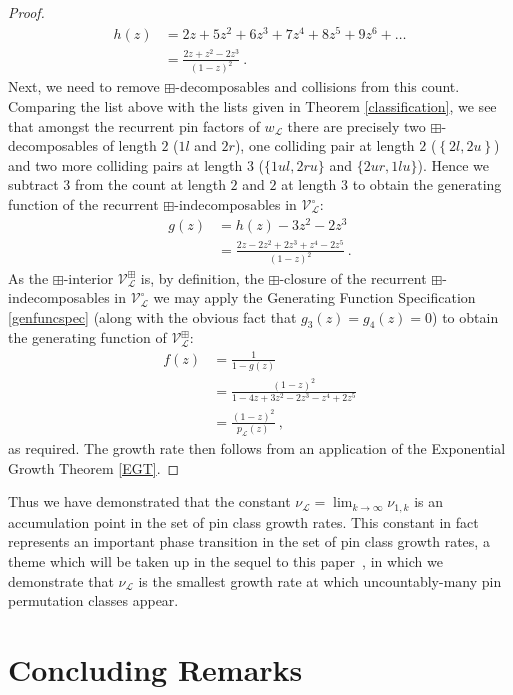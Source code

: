 \documentclass[11pt,a4paper]{article}
\theoremstyle{definition}
\begin{document}
\begin{proof}
\[
\begin{split}
h(z) & = 2z + 5z^2 + 6z^3 + 7z^4 + 8z^5 + 9z^6 + \dots \\
 & = \frac{2z + z^2 - 2z^3}{(1-z)^2} \ .
\end{split}
\]
Next, we need to remove $\boxplus$-decomposables and collisions from this count. Comparing the list above with the lists given in Theorem \ref{classification}, we see that amongst the recurrent pin factors of $w_{\mathcal{L}}$ there are precisely two $\boxplus$-decomposables of length $2$ ($1l$ and $2r$), one colliding pair at length $2$ ($\left\{2l,2u\right\}$) and two more colliding pairs at length $3$ ($\{1ul,2ru\}$ and $\{2ur,1lu\}$). Hence we subtract $3$ from the count at length $2$ and $2$ at length $3$ to obtain the generating function of the recurrent $\boxplus$-indecomposables in $\mathcal{V}^{\circ}_{\mathcal{L}}$:
\[
\begin{split}
g(z) & = h(z) - 3z^2 - 2z^3 \\
 & = \frac{2z - 2z^2 + 2z^3 + z^4 - 2z^5}{(1-z)^2} \ .
\end{split}
\]
As the $\boxplus$-interior $\mathcal{V}^{\boxplus}_{\mathcal{L}}$ is, by definition, the $\boxplus$-closure of the recurrent $\boxplus$-indecomposables in $\mathcal{V}^{\circ}_{\mathcal{L}}$ we may apply the Generating Function Specification \ref{genfuncspec} (along with the obvious fact that $g_{3}(z) = g_{4}(z) = 0$) to obtain the generating function of $\mathcal{V}^{\boxplus}_{\mathcal{L}}$:
\[
\begin{split}
f(z) & = \frac{1}{1-g(z)} \\
 & = \frac{(1-z)^2}{1 - 4z + 3z^2 - 2z^3 - z^4 + 2z^5} \\
 & = \frac{(1-z)^2}{p_{\mathcal{L}}(z)} \ ,
\end{split}
\]
as required. The growth rate then follows from an application of the Exponential Growth Theorem \ref{EGT}. \qedhere
\end{proof}

Thus we have demonstrated that the constant $\nu_{\mathcal{L}} = \lim_{k \rightarrow \infty}\nu_{1,k}$ is an accumulation point in the set of pin class growth rates. This constant in fact represents an important phase transition in the set of pin class growth rates, a theme which will be taken up in the sequel to this paper~\cite{brignall2024pinclassesiismall}, in which we demonstrate that $\nu_{\mathcal{L}}$ is the smallest growth rate at which uncountably-many pin permutation classes appear.

\section{Concluding Remarks} \label{sec:5}
\end{document}
